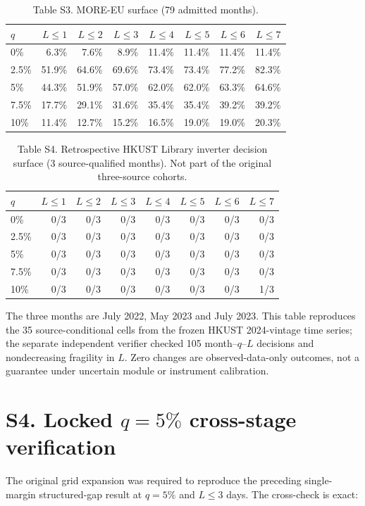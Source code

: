 \documentclass[11pt]{article}
\begin{document}
\begin{table}[h]
\centering
\caption*{Table S3. MORE-EU surface (79 admitted months).}
\begin{tabular}{lrrrrrrr}
\toprule
$q$ & $L\le1$ & $L\le2$ & $L\le3$ & $L\le4$ & $L\le5$ & $L\le6$ & $L\le7$ \\
\midrule
0\% & 6.3\% & 7.6\% & 8.9\% & 11.4\% & 11.4\% & 11.4\% & 11.4\% \\
2.5\% & 51.9\% & 64.6\% & 69.6\% & 73.4\% & 73.4\% & 77.2\% & 82.3\% \\
5\% & 44.3\% & 51.9\% & 57.0\% & 62.0\% & 62.0\% & 63.3\% & 64.6\% \\
7.5\% & 17.7\% & 29.1\% & 31.6\% & 35.4\% & 35.4\% & 39.2\% & 39.2\% \\
10\% & 11.4\% & 12.7\% & 15.2\% & 16.5\% & 19.0\% & 19.0\% & 20.3\% \\
\bottomrule
\end{tabular}
\end{table}

\begin{table}[h]
\centering
\caption*{Table S4. Retrospective HKUST Library inverter decision surface (3 source-qualified months). Not part of the original three-source cohorts.}
\small
\begin{tabular}{lrrrrrrr}
\toprule
$q$ & $L\le1$ & $L\le2$ & $L\le3$ & $L\le4$ & $L\le5$ & $L\le6$ & $L\le7$ \\
\midrule
0\% & 0/3 & 0/3 & 0/3 & 0/3 & 0/3 & 0/3 & 0/3 \\
2.5\% & 0/3 & 0/3 & 0/3 & 0/3 & 0/3 & 0/3 & 0/3 \\
5\% & 0/3 & 0/3 & 0/3 & 0/3 & 0/3 & 0/3 & 0/3 \\
7.5\% & 0/3 & 0/3 & 0/3 & 0/3 & 0/3 & 0/3 & 0/3 \\
10\% & 0/3 & 0/3 & 0/3 & 0/3 & 0/3 & 0/3 & 1/3 \\
\bottomrule
\end{tabular}
\end{table}

The three months are July 2022, May 2023 and July 2023. This table reproduces the 35 source-conditional cells from the frozen HKUST 2024-vintage time series; the separate independent verifier checked 105 month--$q$--$L$ decisions and nondecreasing fragility in $L$. Zero changes are observed-data-only outcomes, not a guarantee under uncertain module or instrument calibration.

\section*{S4. Locked $q=5\%$ cross-stage verification}
The original grid expansion was required to reproduce the preceding single-margin structured-gap result at $q=5\%$ and $L\le3$ days. The cross-check is exact:
\end{document}
